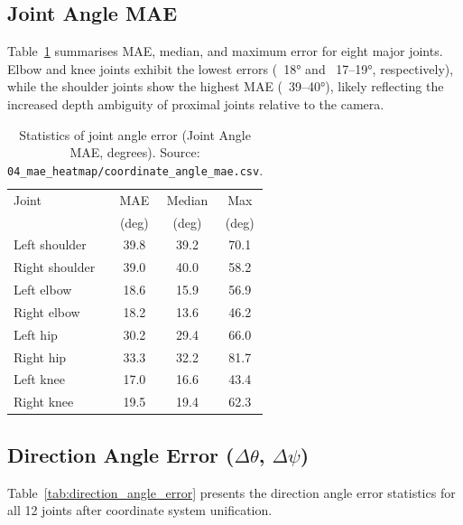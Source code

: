 \documentclass[twocolumn]{article}
\begin{document}
\subsection{Joint Angle MAE}

Table~\ref{tab:joint_angle_error} summarises MAE, median, and maximum
error for eight major joints. Elbow and knee joints exhibit the lowest
errors (~18° and ~17--19°, respectively), while the shoulder joints show
the highest MAE (~39--40°), likely reflecting the increased depth ambiguity
of proximal joints relative to the camera.

\begin{table}[!t]
\centering
\caption{Statistics of joint angle error (Joint Angle MAE, degrees).
  Source: \texttt{04\_mae\_heatmap/coordinate\_angle\_mae.csv}.}
\label{tab:joint_angle_error}
\begin{tabular}{lccc}
\toprule
Joint          & MAE    & Median & Max    \\
               & (deg)  & (deg)  & (deg)  \\
\midrule
Left shoulder  & 39.8   & 39.2   & 70.1   \\
Right shoulder & 39.0   & 40.0   & 58.2   \\
Left elbow     & 18.6   & 15.9   & 56.9   \\
Right elbow    & 18.2   & 13.6   & 46.2   \\
Left hip       & 30.2   & 29.4   & 66.0   \\
Right hip      & 33.3   & 32.2   & 81.7   \\
Left knee      & 17.0   & 16.6   & 43.4   \\
Right knee     & 19.5   & 19.4   & 62.3   \\
\bottomrule
\end{tabular}
\end{table}


\subsection{Direction Angle Error ($\Delta\theta$, $\Delta\psi$)}

Table~\ref{tab:direction_angle_error} presents the direction angle error
statistics for all 12 joints after coordinate system unification.
\end{document}
